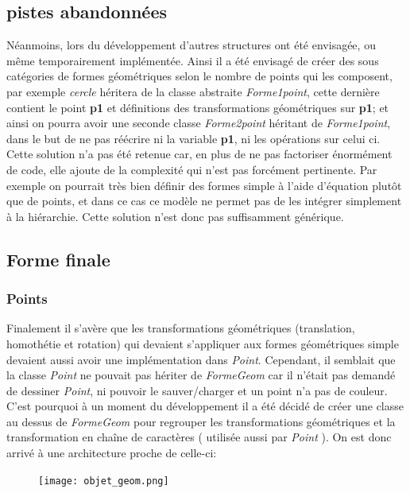 \documentclass[10pt,a4paper]{report}
\begin{document}
\begin{spacing}{0.8}
\subsection{pistes abandonnées}
Néanmoins, lors du développement d'autres structures ont été envisagée, ou même temporairement implémentée.
Ainsi il a été envisagé de créer des sous catégories de formes géométriques selon le nombre de points qui les composent, par exemple \textit{cercle} héritera de la classe abstraite \textit{Forme1point}, cette dernière contient le point \textbf{p1} et définitions des transformations géométriques sur \textbf{p1}; et ainsi on pourra avoir une seconde classe \textit{Forme2point} héritant de \textit{Forme1point}, dans le but de ne pas réécrire ni la variable \textbf{p1}, ni les opérations sur celui ci. Cette solution n'a pas été retenue car, en plus de ne pas factoriser énormément de code, elle ajoute de la complexité qui n'est pas forcément pertinente. Par exemple on pourrait très bien définir des formes simple à l'aide d'équation plutôt que de points, et dans ce cas ce modèle ne permet pas de les intégrer simplement à la hiérarchie. Cette solution n'est donc pas suffisamment générique.

\subsection{Forme finale}
\subsubsection{Points}
Finalement il s'avère que les transformations géométriques (translation, homothétie et rotation) qui devaient s'appliquer aux formes géométriques simple devaient aussi avoir une implémentation dans \textit{Point}. Cependant, il semblait que la classe \textit{Point} ne pouvait pas hériter de \textit{FormeGeom} car il n'était pas demandé de dessiner \textit{Point}, ni pouvoir le sauver/charger et un point n'a pas de couleur. C'est pourquoi à un moment du développement il a été décidé de créer une classe au dessus de \textit{FormeGeom} pour regrouper les transformations géométriques et la transformation en chaîne de caractères ( utilisée aussi par \textit{Point} ). On est donc arrivé à une architecture proche de celle-ci:
\begin{figure}[H]
\texttt{[image: objet\_geom.png]}
\end{figure}

\end{spacing}
\end{document}
